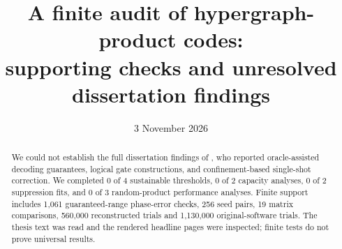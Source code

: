 
\newcommand{\cell}[1]{\raggedright\arraybackslash #1}
\title{A finite audit of hypergraph-product codes:\\supporting checks and unresolved dissertation findings}
\date{3 November 2026}

\maketitle\vspace{-2em}
\begin{abstract}
We could not establish the full dissertation findings of \citet{quintavalle2022}, who reported oracle-assisted decoding guarantees, logical gate constructions, and confinement-based single-shot correction. We completed 0 of 4 sustainable thresholds, 0 of 2 capacity analyses, 0 of 2 suppression fits, and 0 of 3 random-product performance analyses. Finite support includes 1,061 guaranteed-range phase-error checks, 256 seed pairs, 19 matrix comparisons, 560,000 reconstructed trials and 1,130,000 original-software trials. The thesis text was read and the rendered headline pages were inspected; finite tests do not prove universal results.
\end{abstract}

